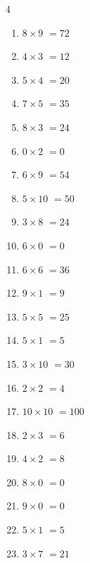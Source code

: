\begin{multicols}{4}
\begin{enumerate}
  \item $8\times 9$
        $=72$

  \item $4\times 3$
        $=12$

  \item $5\times 4$
        $=20$

  \item $7\times 5$
        $=35$

  \item $8\times 3$
        $=24$

  \item $0\times 2$
        $=0$

  \item $6\times 9$
        $=54$

  \item $5\times 10$
        $=50$

  \item $3\times 8$
        $=24$

  \item $6\times 0$
        $=0$

  \item $6\times 6$
        $=36$

  \item $9\times 1$
        $=9$

  \item $5\times 5$
        $=25$

  \item $5\times 1$
        $=5$

  \item $3\times 10$
        $=30$

  \item $2\times 2$
        $=4$

  \item $10\times 10$
        $=100$

  \item $2\times 3$
        $=6$

  \item $4\times 2$
        $=8$

  \item $8\times 0$
        $=0$

  \item $9\times 0$
        $=0$

\columnbreak %

  \item $5\times 1$
        $=5$

  \item $3\times 7$
        $=21$


\end{enumerate}
\end{multicols}
